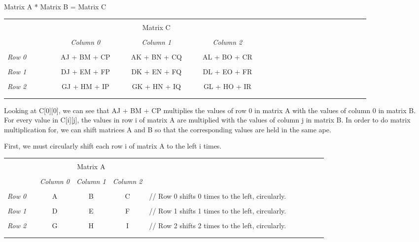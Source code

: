 \documentclass[10pt]{article}
\begin{document}
Matrix A * Matrix B = Matrix C

\begin{tabular}{l*{26}{c}r}
  \\
  \\
  & & & & & & & & Matrix C\\
  \\
  & & & & &
  \textit{Column 0} & & &
  \textit{Column 1} & & &
  \textit{Column 2} \\
  \\
  \textit{Row 0} & & & & &
  AJ + BM + CP &&& AK + BN + CQ &&& AL + BO + CR \\
  \\
  \textit{Row 1} & & & & &
  DJ + EM + FP &&& DK + EN + FQ &&& DL + EO + FR \\
  \\
  \textit{Row 2} & & & & &
  GJ + HM + IP &&& GK + HN + IQ &&& GL + HO + IR \\
  \\
  \\
\end{tabular}

Looking at C[0][0], we can see that AJ + BM + CP multiplies the values of row 0 in matrix A with the values of column 0 in matrix B.  For every value in C[i][j], the values in row i of matrix A are multiplied with the values of column j in matrix B.  In order to do matrix multiplication for, we can shift matrices A and B so that the corresponding values are held in the same ape. \par
First, we must circularly shift each row i of matrix A to the left i times. \par
  
\begin{tabular}{l*{9}{c}r}
  \\
  \\
  & & & Matrix A \\
  \\
  & &
  \textit{Column 0} &
  \textit{Column 1} &
  \textit{Column 2} & \\
  \\
  \textit{Row 0} & & A & B & C & // Row 0 shifts 0 times to the left, circularly.\\
  \\
  \textit{Row 1} & & D & E & F & // Row 1 shifts 1 times to the left, circularly.\\
  \\
  \textit{Row 2} & & G & H & I & // Row 2 shifts 2 times to the left, circularly.\\
  \\
  \\
\end{tabular}
\end{document}
